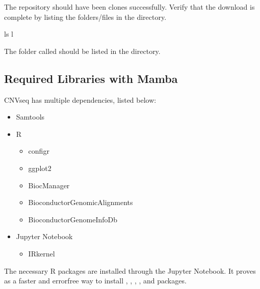 \documentclass[letterpaper,10pt,english]{sphinxhowto}
\begin{document}
\sphinxAtStartPar
The  repository should have been clones successfully. Verify that the download is complete by listing the folders/files in the directory.

\begin{sphinxVerbatim}[commandchars=\\\{\}]
\PYGZdl{} ls \PYGZhy{}l
\end{sphinxVerbatim}

\sphinxAtStartPar
The folder called  should be listed in the directory.


\subsection{Required Libraries with Mamba}
\label{\detokenize{index:required-libraries-with-mamba}}
\sphinxAtStartPar
CNVseq has multiple dependencies, listed below:
\begin{itemize}
\item {} 
\sphinxAtStartPar
Samtools

\item {} 
\sphinxAtStartPar
R
\begin{itemize}
\item {} 
\sphinxAtStartPar
configr

\item {} 
\sphinxAtStartPar
ggplot2

\item {} 
\sphinxAtStartPar
BiocManager

\item {} 
\sphinxAtStartPar
Bioconductor\sphinxhyphen{}GenomicAlignments

\item {} 
\sphinxAtStartPar
Bioconductor\sphinxhyphen{}GenomeInfoDb

\end{itemize}

\item {} 
\sphinxAtStartPar
Jupyter Notebook
\begin{itemize}
\item {} 
\sphinxAtStartPar
IRkernel

\end{itemize}

\end{itemize}

\sphinxAtStartPar
The necessary R packages are installed through the Jupyter Notebook. It proves as a faster and error\sphinxhyphen{}free way to install , , , , and  packages.
\end{document}
